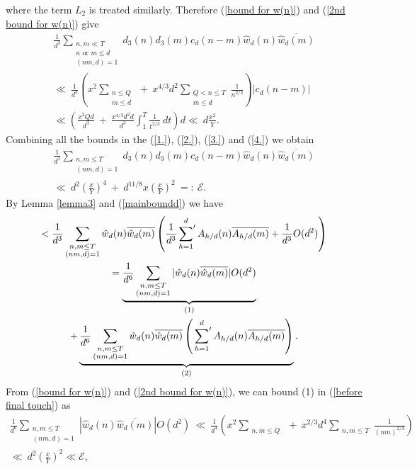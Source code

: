 \documentclass[oneside,reqno,10pt]{amsart}
\numberwithin{equation}{section}
\theoremstyle{plain}
\theoremstyle{definition}
\numberwithin{equation}{section}
\begin{document}
where the term $L_2$ is treated similarly.  Therefore (\ref{bound for w(n)}) and (\ref{2nd bound for w(n)}) give
\begin{multline}\label{4.}
    \frac{1}{d^3} \sum_{\substack{n,m\ll T\\n\text{ or }m\leq d\\(nm,d)=1}}d_3(n)d_3(m)c_d(n-m) \hat{w}_d(n)\overline{\hat{w}_d(m)}\\
    \ll\ \frac{1}{d^3}\left(x^2\sum_{\substack{n\leq Q\\m\leq d}}\ +\ x^{4/3}d^2\sum_{\substack{Q<n\leq T\\m\leq d}} \frac{1}{n^{2/3}}\right)|c_d(n-m)|\\
    \ll \left(\frac{x^2Qd}{d^3}\ +\ \frac{x^{4/3}d^2d}{d^3}\int_{1}^{T}\frac{1}{t^{2/3}}\ dt\right)d \ll\ d\frac{x^2}{Y}.
\end{multline}
Combining all the bounds in the (\ref{1.}), (\ref{2.}), (\ref{3.}) and (\ref{4.}) we obtain
\begin{multline}\label{mainboundd}
     \frac{1}{d^3} \sum_{\substack{n,m\leq T\\(nm,d)=1}}d_3(n)d_3(m)c_d(n-m) \hat{w}_d(n)\overline{\hat{w}_d(m)}\\
     \ll\ d^2\left(\frac{x}{Y}\right)^4\ +\ d^{11/8}x\left(\frac{x}{Y}\right)^2\ =:\ \mathcal{E}.
\end{multline}
By Lemma \ref{lemma3} and (\ref{mainboundd}) we have
\begin{multline}\label{before final touch}
   < \frac{1}{d^3} \sum_{\substack{n,m\leq T\\(nm,d)=1}} \hat{w}_d(n)\overline{\hat{w}_d(m)}\left(\frac{1}{d^3}\sideset{}{'}\sum\limits_{h=1}^dA_{h/d}(n)\overline{A_{h/d}(m)}+\frac{1}{d^3}O(d^2)\right)\\
    = \underbrace{\frac{1}{d^6}\sum_{\substack{n,m\leq T\\(nm,d)=1}} | \hat{w}_d(n)\overline{\hat{w}_d(m)}|O(d^{2})}_{(1)}\\
    + \underbrace{\frac{1}{d^6} \sum_{\substack{n,m\leq T\\(nm,d)=1}} \hat{w}_d(n)\overline{\hat{w}_d(m)}\left(\sideset{}{'}\sum\limits_{h=1}^dA_{h/d}(n)\overline{A_{h/d}(m)}\right)}_{(2)}.
\end{multline}
From (\ref{bound for w(n)}) and (\ref{2nd bound for w(n)}), we can bound (1) in (\ref{before final touch}) as
\begin{multline}\label{lemma3 eki}
    \frac{1}{d^6}\sum_{\substack{n,m\leq T\\(nm,d)=1}} | \hat{w}_d(n)\overline{\hat{w}_d(m)}|O(d^{2})\ \ll\ \frac{1}{d^4}\left(x^2\sum_{\substack{n,m\leq Q}}\ +\ x^{2/3}d^4\sum_{\substack{n,m\leq T}} \frac{1}{(nm)^{2/3}}\right)\\
    \ll\ d^2\left(\frac{x}{Y}\right)^2\ll \mathcal{E},
\end{multline}
\end{document}
